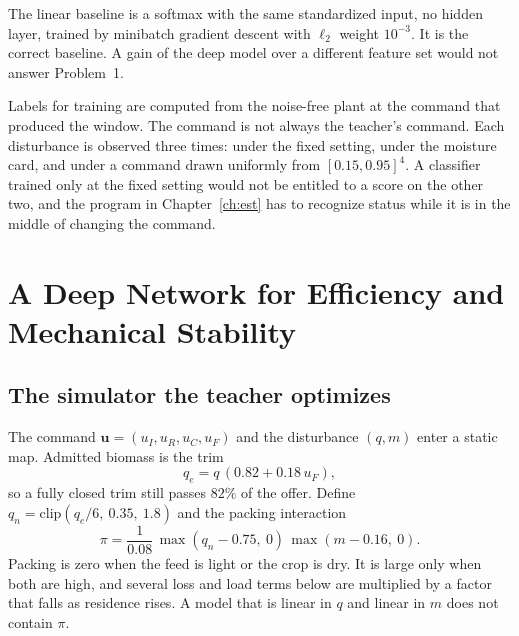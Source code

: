 The linear baseline is a softmax with the same standardized input, no hidden layer, trained by minibatch gradient descent with \(\ell_2\) weight \(10^{-3}\). It is the correct baseline. A gain of the deep model over a different feature set would not answer Problem~1.

Labels for training are computed from the noise-free plant at the command that produced the window. The command is not always the teacher's command. Each disturbance is observed three times: under the fixed setting, under the moisture card, and under a command drawn uniformly from \([0.15,0.95]^4\). A classifier trained only at the fixed setting would not be entitled to a score on the other two, and the program in Chapter~\ref{ch:est} has to recognize status while it is in the middle of changing the command.

\section{A Deep Network for Efficiency and Mechanical Stability}
\label{sec:net}

\subsection{The simulator the teacher optimizes}

The command \(\mathbf{u}=(u_I,u_R,u_C,u_F)\) and the disturbance \((q,m)\) enter a static map. Admitted biomass is the trim
\begin{equation}
q_e = q\,(0.82 + 0.18\,u_F),
\label{eq:qe}
\end{equation}
so a fully closed trim still passes \(82\%\) of the offer. Define \(q_n=\mathrm{clip}(q_e/6,\ 0.35,\ 1.8)\) and the packing interaction
\begin{equation}
\pi = \frac{1}{0.08}\,\max(q_n-0.75,\ 0)\,\max(m-0.16,\ 0).
\label{eq:pack}
\end{equation}
Packing is zero when the feed is light or the crop is dry. It is large only when both are high, and several loss and load terms below are multiplied by a factor that falls as residence rises. A model that is linear in \(q\) and linear in \(m\) does not contain \(\pi\).

